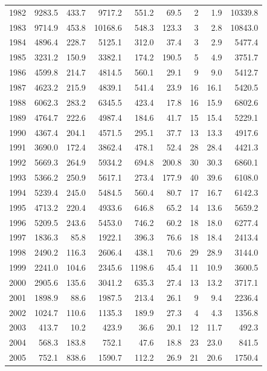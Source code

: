 \documentclass[12pt,]{article}
\begin{document}
\begin{longtable}{rrrrrrrrr}
  1982 & 9283.5 & 433.7 & 9717.2 & 551.2 & 69.5 & 2 & 1.9 & 10339.8 \\ 
  1983 & 9714.9 & 453.8 & 10168.6 & 548.3 & 123.3 & 3 & 2.8 & 10843.0 \\ 
  1984 & 4896.4 & 228.7 & 5125.1 & 312.0 & 37.4 & 3 & 2.9 & 5477.4 \\ 
  1985 & 3231.2 & 150.9 & 3382.1 & 174.2 & 190.5 & 5 & 4.9 & 3751.7 \\ 
  1986 & 4599.8 & 214.7 & 4814.5 & 560.1 & 29.1 & 9 & 9.0 & 5412.7 \\ 
  1987 & 4623.2 & 215.9 & 4839.1 & 541.4 & 23.9 & 16 & 16.1 & 5420.5 \\ 
  1988 & 6062.3 & 283.2 & 6345.5 & 423.4 & 17.8 & 16 & 15.9 & 6802.6 \\ 
  1989 & 4764.7 & 222.6 & 4987.4 & 184.6 & 41.7 & 15 & 15.4 & 5229.1 \\ 
  1990 & 4367.4 & 204.1 & 4571.5 & 295.1 & 37.7 & 13 & 13.3 & 4917.6 \\ 
  1991 & 3690.0 & 172.4 & 3862.4 & 478.1 & 52.4 & 28 & 28.4 & 4421.3 \\ 
  1992 & 5669.3 & 264.9 & 5934.2 & 694.8 & 200.8 & 30 & 30.3 & 6860.1 \\ 
  1993 & 5366.2 & 250.9 & 5617.1 & 273.4 & 177.9 & 40 & 39.6 & 6108.0 \\ 
  1994 & 5239.4 & 245.0 & 5484.5 & 560.4 & 80.7 & 17 & 16.7 & 6142.3 \\ 
  1995 & 4713.2 & 220.4 & 4933.6 & 646.8 & 65.2 & 14 & 13.6 & 5659.2 \\ 
  1996 & 5209.5 & 243.6 & 5453.0 & 746.2 & 60.2 & 18 & 18.0 & 6277.4 \\ 
  1997 & 1836.3 & 85.8 & 1922.1 & 396.3 & 76.6 & 18 & 18.4 & 2413.4 \\ 
  1998 & 2490.2 & 116.3 & 2606.4 & 438.1 & 70.6 & 29 & 28.9 & 3144.0 \\ 
  1999 & 2241.0 & 104.6 & 2345.6 & 1198.6 & 45.4 & 11 & 10.9 & 3600.5 \\ 
  2000 & 2905.6 & 135.6 & 3041.2 & 635.3 & 27.4 & 13 & 13.2 & 3717.1 \\ 
  2001 & 1898.9 & 88.6 & 1987.5 & 213.4 & 26.1 & 9 & 9.4 & 2236.4 \\ 
  2002 & 1024.7 & 110.6 & 1135.3 & 189.9 & 27.3 & 4 & 4.3 & 1356.8 \\ 
  2003 & 413.7 & 10.2 & 423.9 & 36.6 & 20.1 & 12 & 11.7 & 492.3 \\ 
  2004 & 568.3 & 183.8 & 752.1 & 47.6 & 18.8 & 23 & 23.0 & 841.5 \\ 
  2005 & 752.1 & 838.6 & 1590.7 & 112.2 & 26.9 & 21 & 20.6 & 1750.4 \\ 

\end{longtable}
\end{document}
